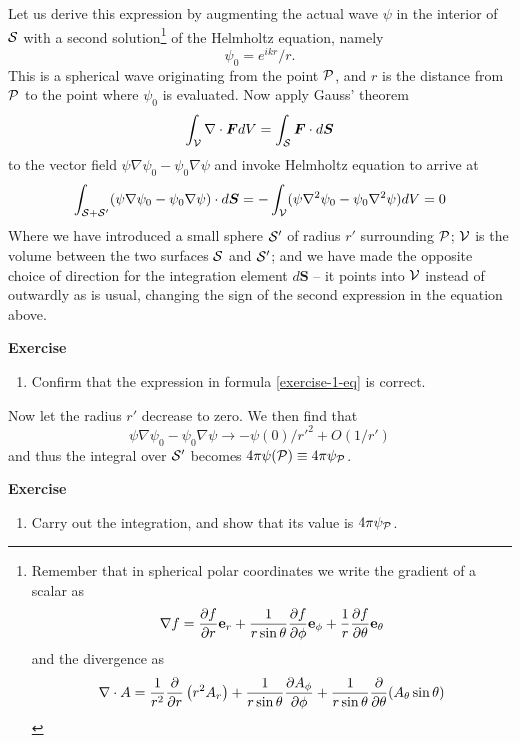 Let us derive this expression by augmenting the actual wave $\psi$ in the interior of ${\cal S}$
with a second solution\footnote{Remember that in spherical polar coordinates we
write the gradient of a scalar as 
\[
\nabla f={\partial f\over\partial r}{\bf e}_r
     +{1\over r\sin\theta}{\partial f\over\partial\phi}{\bf e}_\phi
     +{1\over r}{\partial f\over\partial\theta}{\bf e}_\theta
\] 
and the divergence as 
\[
{\nabla\cdot A}={1\over r^2}{\partial\over\partial r}\left(r^2A_r\right)
+{1\over r\sin\theta}{\partial A_\phi\over\partial\phi}
+{1\over r\sin\theta}{\partial\over\partial\theta}(A_\theta\sin\theta)
\]} of the Helmholtz equation, namely
\[
\psi_0={e^{ikr}/r}.
\]
This is a spherical wave originating from the point ${\cal P}$, and $r$ is the distance from 
${\cal P}$ to the point where $\psi_0$ is evaluated. Now apply Gauss' theorem 
\[
\int_{\cal V}\nabla\cdot{\bm F}dV=\int_{\cal S}{\bm F}\cdot d{\bm S}
\]
to the vector field $\psi\nabla\psi_0-\psi_0\nabla\psi$ and invoke Helmholtz equation to 
arrive at 
\[
\int_{{\cal S}+{\cal S}'}(\psi\nabla\psi_0-\psi_0\nabla\psi)\cdot d{\bm S}
           =-\int_{\cal V}(\psi\nabla^2\psi_0-\psi_0\nabla^2\psi)dV=0
\]
Where we have introduced a small sphere ${\cal S}'$ of radius $r'$ surrounding ${\cal P}$; ${\cal V}$
is the volume between the two surfaces ${\cal S}$ and ${\cal S}'$; and we have made the opposite 
choice of direction for the integration element $d{\bm S}$ -- it points into ${\cal V}$ instead
of outwardly as is usual, changing the sign of the second expression in the equation above. 

{\bf Exercise}

\begin{enumerate}
	\item Confirm that the expression in formula \ref{exercise-1-eq} is correct.
\setcounter{count}{\value{enumi}} 
\end{enumerate}

Now let the radius $r'$ decrease to zero. We then find that 
\[
\psi\nabla\psi_0-\psi_0\nabla\psi\rightarrow {-\psi(0)/{r'}^2}+O({1/r'})
\]
and thus the integral over ${\cal S}'$ becomes $4\pi\psi({\cal P})\equiv
4\pi\psi_{\cal P}$. 

{\bf Exercise}

\begin{enumerate}
\setcounter{enumi}{\value{count}}
\item Carry out the integration, and show that its value is $4\pi\psi_{{\cal P}}$.
\setcounter{count}{\value{enumi}} 
\end{enumerate}


